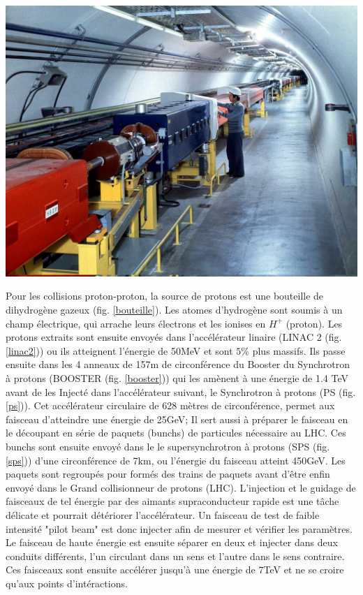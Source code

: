 \marginpar
{
	
	\includegraphics[width=\marginparwidth]{LHC/sps.jpg}
    	\label{sps}
}
Pour les collisions proton-proton, la source de protons est une bouteille de dihydrogène gazeux (fig. \ref{bouteille}). Les atomes d’hydrogène sont soumis à un champ électrique, qui arrache leurs électrons et les ionises en $H^{+}$ (proton). Les protons extraits sont ensuite envoyés dans l'accélérateur linaire (LINAC 2 (fig. \ref{linac2})) ou ils atteignent l'énergie de 50MeV et sont $5\%$ plus massifs. Ils passe ensuite dans les 4 anneaux de 157m de circonférence du Booster du Synchrotron à protons (BOOSTER (fig. \ref{booster})) qui les amènent à une énergie de 1.4 TeV avant de les Injecté dans l'accélérateur suivant, le Synchrotron à protons (PS (fig. \ref{ps})). Cet accélérateur circulaire de 628 mètres de circonférence, permet aux faisceau d'atteindre une énergie de 25GeV; Il sert aussi à préparer le faisceau en le découpant en série de paquets (bunchs) de particules nécessaire au LHC. Ces bunchs sont ensuite envoyé dans le le supersynchrotron à protons (SPS (fig. \ref{sps})) d'une circonférence de 7km, ou l'énergie du faisceau atteint 450GeV. Les paquets sont regroupés pour formés des trains de paquets avant d'être enfin envoyé dans le Grand collisionneur de protons (LHC). L'injection et le guidage de faisceaux de tel énergie par des aimants supraconducteur rapide est une tâche délicate et pourrait détériorer l'accélérateur. Un faisceau de test de faible intensité "pilot beam" est donc injecter afin de mesurer et vérifier les paramètres. Le faisceau de haute énergie est ensuite séparer en deux et injecter dans deux conduits différents, l'un circulant dans un sens et l'autre dans le sens contraire. Ces faisceaux sont ensuite accélérer jusqu'à une énergie de 7TeV et ne se croire qu'aux points d'intéractions.

